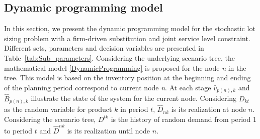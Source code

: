 \documentclass[10pt]{article}
\newcommand{\ti}{t} %
\newcommand{\TI}{T}
\newcommand{\ka}{k} %
\newcommand{\jey}{j} %
\newcommand{\Bi}{B} %
\newcommand{\Vi}{v} %
\begin{document}
 
 









\subsection{Dynamic programming model}


In this section, we present the dynamic programming model for the stochastic lot sizing problem with a firm-driven substitution and joint service level constraint. Different sets, parameters and decision variables are presented in Table~\ref{tab:Sub_parameters}. Considering the underlying scenario tree, the mathematical model \ref{DynamicProgramming} is proposed for the node {\it n} in the tree. This model is based on the inventory position at the beginning and ending of the planning period correspond to current node {\it n}. At each stage $\hat{\Vi}_{p(n),{\ka}}$ and $\hat{\Bi}_{p(n),{\ka}}$ illustrate the state of the system for the current node. Considering $D_{\ka\ti}$ as the random variable for product $\ka$ in period $\ti$, $\hat{D}_{n \ka}$ is its realization at node $n$. Considering the scenario tree, $D^{\ti \ka}$ is the history of  random demand from period 1 to period $\ti$ and $\hat{D}^{nk}$ is its realization until node $n$.  
\end{document}
